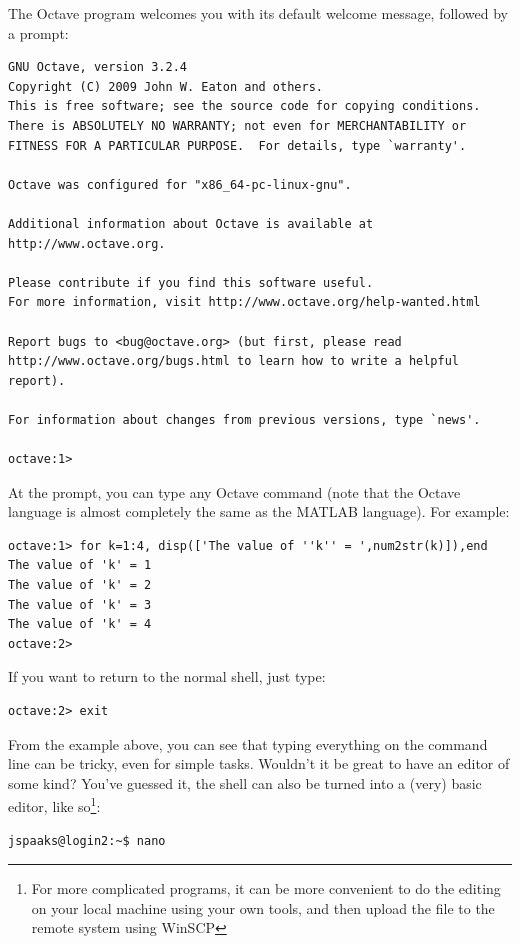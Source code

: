The Octave program welcomes you with its default welcome message, followed by a prompt:
\begin{lstlisting}[style=basic,style=bash]
GNU Octave, version 3.2.4
Copyright (C) 2009 John W. Eaton and others.
This is free software; see the source code for copying conditions.
There is ABSOLUTELY NO WARRANTY; not even for MERCHANTABILITY or
FITNESS FOR A PARTICULAR PURPOSE.  For details, type `warranty'.

Octave was configured for "x86_64-pc-linux-gnu".

Additional information about Octave is available at http://www.octave.org.

Please contribute if you find this software useful.
For more information, visit http://www.octave.org/help-wanted.html

Report bugs to <bug@octave.org> (but first, please read
http://www.octave.org/bugs.html to learn how to write a helpful report).

For information about changes from previous versions, type `news'.

octave:1>
\end{lstlisting}
At the prompt, you can type any Octave command (note that the Octave language is almost completely the same as the MATLAB language). For example:
\begin{lstlisting}[style=basic,style=bash]
octave:1> for k=1:4, disp(['The value of ''k'' = ',num2str(k)]),end
The value of 'k' = 1
The value of 'k' = 2
The value of 'k' = 3
The value of 'k' = 4
octave:2>
\end{lstlisting}
If you want to return to the normal shell, just type:
\begin{lstlisting}[style=basic,style=bash]
octave:2> exit
\end{lstlisting}

From the example above, you can see that typing everything on the command line can be tricky, even for simple tasks. Wouldn't it be great to have an editor of some kind? You've guessed it, the shell can also be turned into a (very) basic editor, like so\footnote{For more complicated programs, it can be more convenient to do the editing on your local machine using your own tools, and then upload the file to the remote system using WinSCP}:
\begin{lstlisting}[style=basic,style=bash]
jspaaks@login2:~$ nano
\end{lstlisting}

